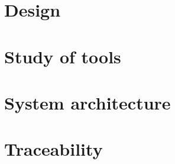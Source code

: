 \section{Design}\label{chap:design}

\section{Study of tools}\label{sec:study}

\section{System architecture}\label{sec:architecture}






\section{Traceability}\label{sec:comp-traceability}
